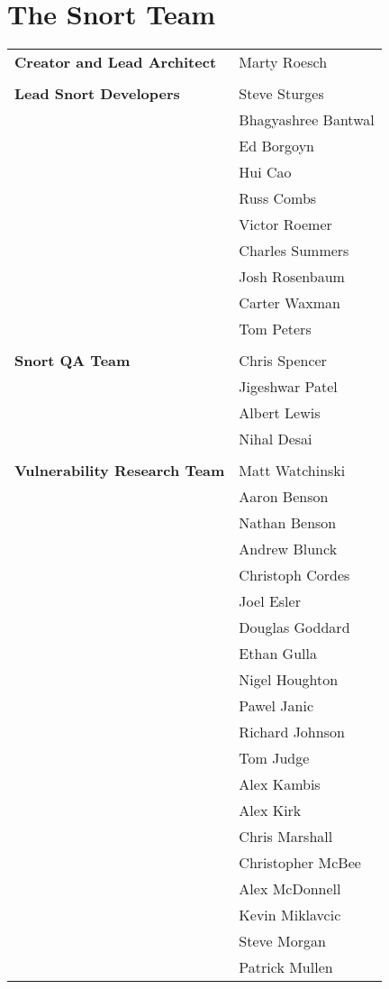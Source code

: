 \documentclass[english]{report}
\begin{document}
\section{The Snort Team}

\begin{tabular}{p{3in} p{3in}}

\textbf{Creator and Lead Architect}
& Marty Roesch\\
\\
\textbf{Lead Snort Developers}
& Steve Sturges\\
& Bhagyashree Bantwal\\
& Ed Borgoyn\\
& Hui Cao\\
& Russ Combs\\
& Victor Roemer\\
& Charles Summers\\
& Josh Rosenbaum\\
& Carter Waxman\\
& Tom Peters\\
\\
\textbf{Snort QA Team}
& Chris Spencer\\
& Jigeshwar Patel\\
& Albert Lewis\\
& Nihal Desai\\
\\
\textbf{Vulnerability Research Team}
& Matt Watchinski\\
& Aaron Benson\\
& Nathan Benson\\
& Andrew Blunck\\
& Christoph Cordes\\
& Joel Esler\\
& Douglas Goddard\\
& Ethan Gulla\\
& Nigel Houghton\\
& Pawel Janic\\
& Richard Johnson\\
& Tom Judge\\
& Alex Kambis\\
& Alex Kirk\\
& Chris Marshall\\
& Christopher McBee\\
& Alex McDonnell\\
& Kevin Miklavcic\\
& Steve Morgan\\
& Patrick Mullen\\

\end{tabular}
\end{document}

